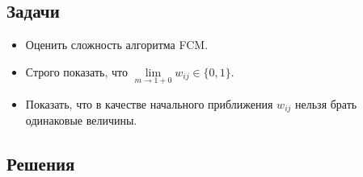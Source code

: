\subsection{Задачи}

\begin{itemize}
    \item Оценить сложность алгоритма FCM.
    \item Строго показать, что $\lim\limits_{m \to 1 + 0} w_{ij} \in \{0, 1\}$.
    \item Показать, что в качестве начального приближения $w_{ij}$ нельзя брать одинаковые величины.
\end{itemize}

\subsection{Решения}

